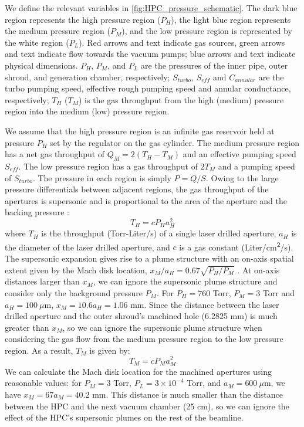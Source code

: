 We define the relevant variables in \cref{fig:HPC_pressure_schematic}. The dark blue region represents the high pressure region ($P_H$), the light blue region represents the medium pressure region ($P_M$), and the low pressure region is represented by the white region ($P_L$). Red arrows and text indicate gas sources, green arrows and text indicate flow towards the vacuum pumps; blue arrows and text indicate physical dimensions. $P_H$, $P_M$, and $P_L$ are the pressures of the inner pipe, outer shroud, and generation chamber, respectively; $S_{turbo}$, $S_{eff}$ and $C_{annular}$ are the turbo pumping speed, effective rough pumping speed and annular conductance, respectively; $T_H$ ($T_M$) is the gas throughput from the high (medium) pressure region into the medium (low) pressure region.

We assume that the high pressure region is an infinite gas reservoir held at pressure $P_H$ set by the regulator on the gas cylinder. The medium pressure region has a net gas throughput of $Q_M = 2(T_H - T_M)$ and an effective pumping speed $S_{eff}$. The low pressure region has a gas throughput of $2T_M$ and a pumping speed of $S_{turbo}$. The pressure in each region is simply $P = Q / S$. Owing to the large pressure differentials between adjacent regions, the gas throughput of the apertures is supersonic and is proportional to the area of the aperture and the backing pressure \cite{millerFreeJetSources1988}:
\begin{equation}
T_H = c P_H a_H^2
\end{equation}
where $T_H$ is the throughput (Torr-Liter/s) of a single laser drilled aperture, $a_H$ is the diameter of the laser drilled aperture, and $c$ is a gas constant (Liter/cm\textsuperscript{2}/s). The supersonic expansion gives rise to a plume structure with an on-axis spatial extent given by the Mach disk location, $x_M / a_H = 0.67 \sqrt{P_H/P_M}$ \cite{millerFreeJetSources1988}. At on-axis distances larger than $x_M$, we can ignore the supersonic plume structure and consider only the background pressure $P_M$. For $P_H = 760$ Torr, $P_M = 3$ Torr and $a_H = 100 \ \mu$m, $x_M = 10.6 a_H = 1.06$ mm. Since the distance between the laser drilled aperture and the outer shroud's machined hole (6.2825 mm) is much greater than $x_M$, so we can ignore the supersonic plume structure when considering the gas flow from the medium pressure region to the low pressure region. As a result, $T_M$ is given by:
\begin{equation}
T_M = c P_M a_M^2
\end{equation}
We can calculate the Mach disk location for the machined apertures using reasonable values: for $P_M = 3$ Torr, $P_L = 3 \times 10^{-4}$ Torr, and $a_M = 600 \ \mu$m, we have $x_M = 67 a_M = 40.2$ mm. This distance is much smaller than the distance between the HPC and the next vacuum chamber (25 cm), so we can ignore the effect of the HPC's supersonic plumes on the rest of the beamline.

